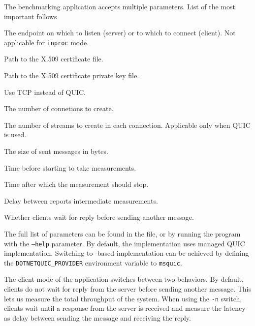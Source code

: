 The benchmarking application accepts multiple parameters. List of the most important follows

\begin{description}

     The endpoint on which to listen (server) or to which to connect (client). Not applicable for \texttt{inproc} mode.

     Path to the X.509 certificate file.

     Path to the X.509 certificate private key file.

     Use TCP instead of QUIC\@.

     The number of connetions to create.

     The number of streams to create in each connection. Applicable only when QUIC is used.

     The size of sent messages in bytes.

     Time before starting to take measurements.

     Time after which the measurement should stop.

     Delay between reports intermediate measurements.

     Whether clients wait for reply before sending another message.

\end{description}

The full list of parameters can be found in the  file, or by running the
program with the \texttt{--help} parameter. By default, the implementation uses managed QUIC
implementation. Switching to \libmsquic{}-based implementation can be achieved by defining the
\texttt{DOTNETQUIC_PROVIDER} environment variable to \texttt{msquic}.

The client mode of the application switches between two behaviors. By default, clients do not wait
for reply from the server before sending another message. This lets us measure the total throughput
of the system. When using the \texttt{-n} switch, clients wait until a response from the server is
received and measure the latency as delay between sending the message and receiving the reply.

